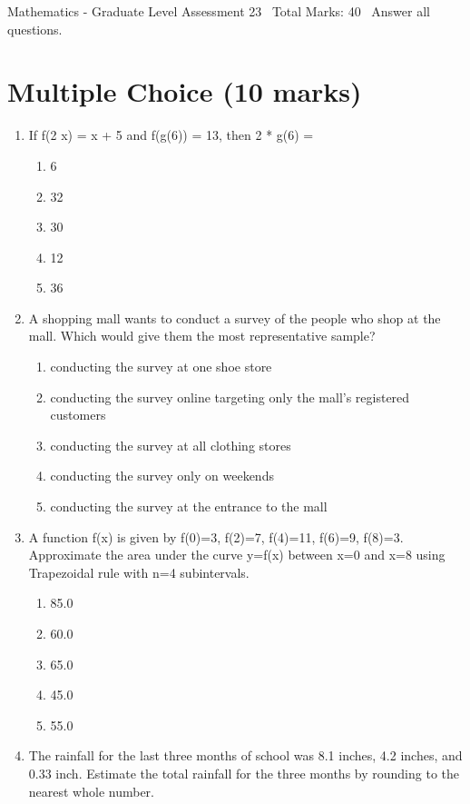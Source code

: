 \documentclass[12pt]{article}
\begin{document}
\begin{center}
Mathematics - Graduate Level Assessment 23 \
Total Marks: 40 \
Answer all questions.
\end{center}

\section*{Multiple Choice (10 marks)}
\begin{enumerate}[label=\arabic*.]
\item If f(2 x) = x + 5 and f(g(6)) = 13, then 2 * g(6) =
\begin{enumerate}[label=(\alph*)]
    \item 6
    \item 32
    \item 30
    \item 12
    \item 36
\end{enumerate}
\item A shopping mall wants to conduct a survey of the people who shop at the mall. Which would give them the most representative sample?
\begin{enumerate}[label=(\alph*)]
    \item conducting the survey at one shoe store
    \item conducting the survey online targeting only the mall's registered customers
    \item conducting the survey at all clothing stores
    \item conducting the survey only on weekends
    \item conducting the survey at the entrance to the mall
\end{enumerate}
\item A function f(x) is given by f(0)=3, f(2)=7, f(4)=11, f(6)=9, f(8)=3. Approximate the area under the curve y=f(x) between x=0 and x=8 using Trapezoidal rule with n=4 subintervals.
\begin{enumerate}[label=(\alph*)]
    \item 85.0
    \item 60.0
    \item 65.0
    \item 45.0
    \item 55.0
\end{enumerate}
\item The rainfall for the last three months of school was 8.1 inches, 4.2 inches, and 0.33 inch. Estimate the total rainfall for the three months by rounding to the nearest whole number.

\end{enumerate}
\end{document}
